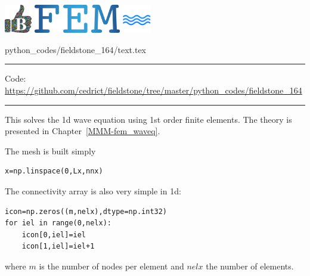 \noindent
\includegraphics[height=1.25cm]{images/pictograms/benchmark}
\includegraphics[height=1.25cm]{images/pictograms/FEM}
\includegraphics[height=1.25cm]{images/pictograms/wave}


\begin{flushright} {\tiny {\color{gray} python\_codes/fieldstone\_164/text.tex}} \end{flushright}

%

\par\noindent\rule{\textwidth}{0.4pt}

\begin{center}
\inpython
{\small Code: \url{https://github.com/cedrict/fieldstone/tree/master/python_codes/fieldstone_164}}
\end{center}

\par\noindent\rule{\textwidth}{0.4pt}


This \stone solves the 1d wave equation using 1st order finite elements. 
The theory is presented in Chapter~\ref{MMM-fem_waveq}. 


The mesh is built simply
\begin{lstlisting}
x=np.linspace(0,Lx,nnx)
\end{lstlisting}
The connectivity array is also very simple in 1d:
\begin{lstlisting}
icon=np.zeros((m,nelx),dtype=np.int32)
for iel in range(0,nelx):
    icon[0,iel]=iel
    icon[1,iel]=iel+1
\end{lstlisting}
where $m$ is the number of nodes per element and $nelx$ the number of elements.

